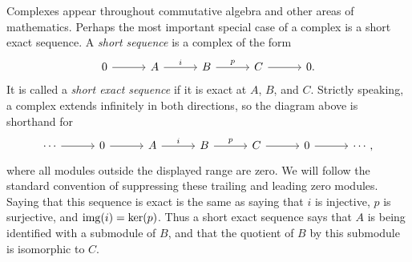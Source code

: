 \documentclass[Notebook.tex]{subfiles}
\begin{document}
Complexes appear throughout commutative algebra and other areas of mathematics. Perhaps the most important special case of a complex is a short exact sequence. A \emph{short sequence} is a complex of the form
\[
\begin{tikzcd}[row sep = .3em, column sep = 3em]
0 \arrow[r] & A \arrow[r, "i"] & B \arrow[r, "p"] & C \arrow[r] & 0.
\end{tikzcd}
\]
It is called a \emph{short exact sequence} if it is exact at $A$, $B$, and $C$. Strictly speaking, a complex extends infinitely in both directions, so the diagram above is shorthand for
\[
\begin{tikzcd}[row sep = .3em, column sep = 3em]
\cdots \arrow[r] & 0 \arrow[r] & A \arrow[r, "i"] & B \arrow[r, "p"] & C \arrow[r] & 0 \arrow[r] & \cdots,
\end{tikzcd}
\]
where all modules outside the displayed range are zero. We will follow the standard convention of suppressing these trailing and leading zero modules. Saying that this sequence is exact is the same as saying that $i$ is injective, $p$ is surjective, and $\operatorname{img}(i)=\ker(p)$. Thus a short exact sequence says that $A$ is being identified with a submodule of $B$, and that the quotient of $B$ by this submodule is isomorphic to $C$.

\hrulefill

\newpage 
\end{document}
